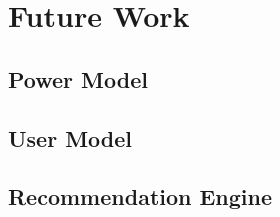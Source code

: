 \section*{Future Work}
\label{sec:future}
\subsection*{Power Model}

\subsection*{User Model}
\subsection*{Recommendation Engine}